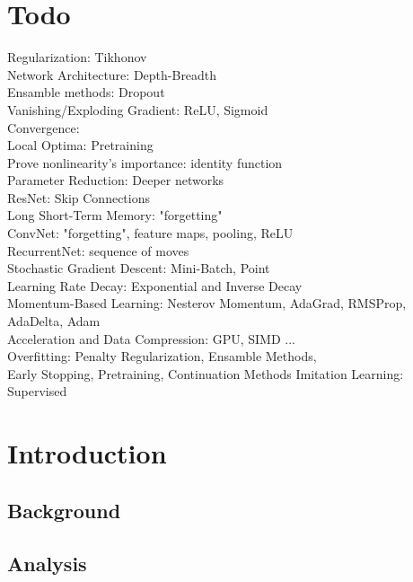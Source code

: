 \documentclass[titlepage]{article}
\begin{document}

\printnomenclature[3cm]

\newpage

\section*{\huge Todo}

\noindent
Regularization: Tikhonov \\
Network Architecture: Depth-Breadth \\
Ensamble methods: Dropout \\
Vanishing/Exploding Gradient: ReLU, Sigmoid \\
Convergence: \\ 
Local Optima: Pretraining \\
Prove nonlinearity's importance: identity function \\
Parameter Reduction: Deeper networks \\
ResNet: Skip Connections \\
\bigskip
Long Short-Term Memory: "forgetting" \\
ConvNet: "forgetting", feature maps, pooling, ReLU \\
RecurrentNet: sequence of moves \\
Stochastic Gradient Descent: Mini-Batch, Point \\
Learning Rate Decay: Exponential and Inverse Decay \\
Momentum-Based Learning: Nesterov Momentum, AdaGrad, RMSProp, \\ AdaDelta, Adam \\
Acceleration and Data Compression: GPU, SIMD ... \\
Overfitting: Penalty Regularization, Ensamble Methods, \\ Early Stopping, Pretraining, Continuation Methods 
Imitation Learning: Supervised 

\clearpage
{}

\newpage
\section{Introduction}

\subsection{Background}
\subsection{Analysis}

\newpage



\end{document}
